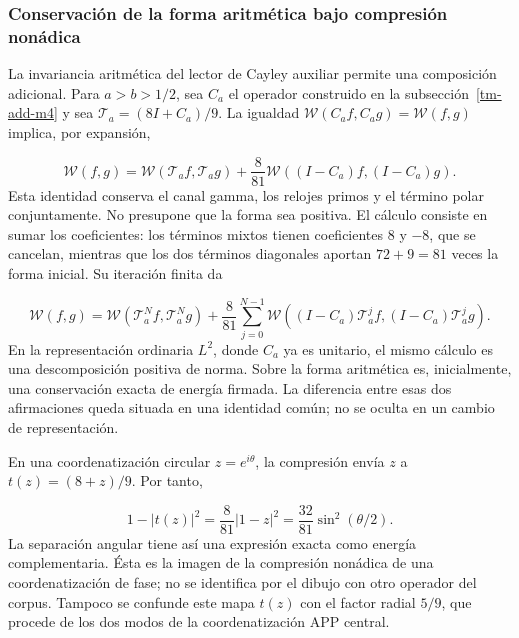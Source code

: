 \subsubsection{Conservación de la forma aritmética bajo compresión nonádica}
\label{tm-add-c4-1}
La invariancia aritmética del lector de Cayley auxiliar permite una composición adicional. Para \(a>b>1/2\), sea \(C_a\) el operador construido en la subsección~\ref{tm-add-m4} y sea \(\mathcal T_a=(8I+C_a)/9\). La igualdad \(\mathscr W(C_af,C_ag)=\mathscr W(f,g)\) implica, por expansión,

\begin{equation}
\boxed{\mathscr W(f,g)=\mathscr W(\mathcal T_af,\mathcal T_ag)
+\frac8{81}\mathscr W((I-C_a)f,(I-C_a)g).}
\label{tm-add-balance-aritmetico}
\end{equation}
Esta identidad conserva el canal gamma, los relojes primos y el término polar conjuntamente. No presupone que la forma sea positiva. El cálculo consiste en sumar los coeficientes: los términos mixtos tienen coeficientes \(8\) y \(-8\), que se cancelan, mientras que los dos términos diagonales aportan \(72+9=81\) veces la forma inicial. Su iteración finita da

\begin{equation}
\mathscr W(f,g)=\mathscr W(\mathcal T_a^Nf,\mathcal T_a^Ng)
+\frac8{81}\sum_{j=0}^{N-1}
\mathscr W((I-C_a)\mathcal T_a^jf,(I-C_a)\mathcal T_a^jg).
\label{tm-add-balance-iterado}
\end{equation}
En la representación ordinaria \(L^2\), donde \(C_a\) ya es unitario, el mismo cálculo es una descomposición positiva de norma. Sobre la forma aritmética es, inicialmente, una conservación exacta de energía firmada. La diferencia entre esas dos afirmaciones queda situada en una identidad común; no se oculta en un cambio de representación.

En una coordenatización circular \(z=e^{i\theta}\), la compresión envía \(z\) a \(t(z)=(8+z)/9\). Por tanto,

\[
1-|t(z)|^2=\frac8{81}|1-z|^2
=\frac{32}{81}\sin^2(\theta/2).
\]
La separación angular tiene así una expresión exacta como energía complementaria. Ésta es la imagen de la compresión nonádica de una coordenatización de fase; no se identifica por el dibujo con otro operador del corpus. Tampoco se confunde este mapa \(t(z)\) con el factor radial \(5/9\), que procede de los dos modos de la coordenatización APP central.



